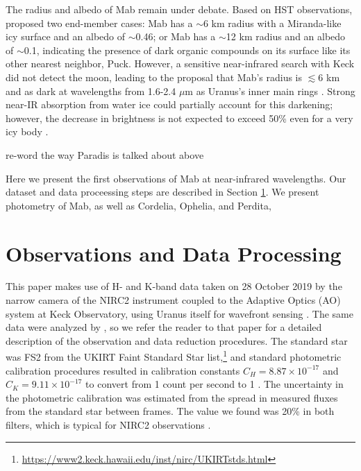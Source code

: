 \documentclass[preprint]{aastex631}
\begin{document}
The radius and albedo of Mab remain under debate. Based on HST observations, \citet{showalter06} proposed two end-member cases: Mab has a $\sim$6 km radius with a Miranda-like icy surface and an albedo of $\sim$0.46; or Mab has a $\sim$12 km radius and an albedo of $\sim$0.1, indicating the presence of dark organic compounds on its surface like its other nearest neighbor, Puck. However, a sensitive near-infrared search with Keck did not detect the moon, leading to the proposal that Mab's radius is $\lesssim$6 km and as dark at wavelengths from 1.6-2.4 $\mu$m as Uranus's inner main rings \citep[albedo $\sim$0.05;][]{paradis19, paradis23}. Strong near-IR absorption from water ice could partially account for this darkening; however, the decrease in brightness is not expected to exceed 50\% even for a very icy body \citep[c.f. Haumea, one of the purest amorphous ice surfaces in the solar system;][]{gourgeot16}.

re-word the way Paradis is talked about above

Here we present the first observations of Mab at near-infrared wavelengths. Our dataset and data proceessing steps are described in Section \ref{s:observations}. We present photometry of Mab, as well as Cordelia, Ophelia, and Perdita, 

\section{Observations and Data Processing}
\label{s:observations}

This paper makes use of H- and K-band data taken on 28 October 2019 by the narrow camera of the NIRC2 instrument coupled to the Adaptive Optics (AO) system at Keck Observatory, using Uranus itself for wavefront sensing \citep{wizinowich00, vandam04}. The same data were analyzed by \citet{paradis23}, so we refer the reader to that paper for a detailed description of the observation and data reduction procedures. The standard star was FS2 from the UKIRT Faint Standard Star list,\footnote{\url{https://www2.keck.hawaii.edu/inst/nirc/UKIRTstds.html}} and standard photometric calibration procedures resulted in calibration constants $C_H = 8.87\times10^{-17}$ and $C_K = 9.11\times10^{-17}$ to convert from 1 count per second to 1 \ergsec. The uncertainty in the photometric calibration was estimated from the spread in measured fluxes from the standard star between frames. The value we found was 20\% in both filters, which is typical for NIRC2 observations \citep{depater14, molter19}.
\end{document}
